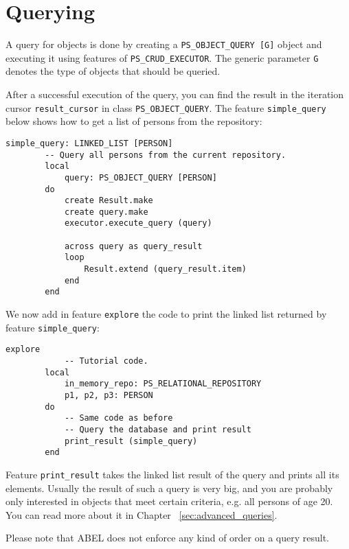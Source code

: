 \documentclass[a4paper,12pt]{report}
\begin{document}
\section{Querying}
\label{section:querying}
A query for objects is done by creating a \lstinline!PS_OBJECT_QUERY [G]! object and executing it using features of \lstinline!PS_CRUD_EXECUTOR!.
The generic parameter \lstinline!G! denotes the type of objects that should be queried.

After a successful execution of the query, you can find the result in the iteration cursor \lstinline{result_cursor} in class \lstinline{PS_OBJECT_QUERY}. The feature \lstinline{simple_query} below shows how to get a list of persons from the repository:

\begin{lstlisting}[language=OOSC2Eiffel, captionpos=b, caption={A simple query.}, label={lst:simple_query}]
	simple_query: LINKED_LIST [PERSON]
		-- Query all persons from the current repository.
		local
			query: PS_OBJECT_QUERY [PERSON]
		do
			create Result.make
			create query.make
			executor.execute_query (query)

			across query as	query_result
			loop
				Result.extend (query_result.item)
			end
		end
\end{lstlisting}
We now add in feature \lstinline{explore} the code to print the linked list returned by feature \lstinline{simple_query}:  
\begin{lstlisting}[language=OOSC2Eiffel, captionpos=b, caption={Printing the query result.}, label={lst:tutorial_print_result}]
	explore
			-- Tutorial code.
		local
			in_memory_repo: PS_RELATIONAL_REPOSITORY
			p1, p2, p3: PERSON
		do
			-- Same code as before
			-- Query the database and print result
			print_result (simple_query)
		end
\end{lstlisting}
Feature  \lstinline{print_result} takes the linked list result of the query and prints all its elements.
Usually the result of such a query is very big, and you are probably only interested in objects that meet certain criteria, e.g. all persons of age 20. You can read more about it in Chapter ~\ref{sec:advanced_queries}.

Please note that ABEL does not enforce any kind of order on a query result.
\end{document}

